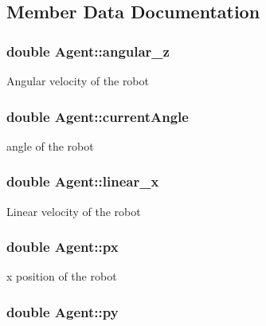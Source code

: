\subsection{Member Data Documentation}
\hypertarget{classAgent_affc842049c5010a5f8bd99a62d650a25}{
\subsubsection[{angular\-\_\-z}]{\setlength{\rightskip}{0pt plus 5cm}double Agent\-::angular\-\_\-z\hspace{0.3cm}{\ttfamily [protected]}}}\label{classAgent_affc842049c5010a5f8bd99a62d650a25}
Angular velocity of the robot \hypertarget{classAgent_a389e3229e62da28d6c686354329e25aa}{
\subsubsection[{current\-Angle}]{\setlength{\rightskip}{0pt plus 5cm}double Agent\-::current\-Angle\hspace{0.3cm}{\ttfamily [protected]}}}\label{classAgent_a389e3229e62da28d6c686354329e25aa}
angle of the robot \hypertarget{classAgent_a77dfc60513d8c90b2848297e09fffba7}{
\subsubsection[{linear\-\_\-x}]{\setlength{\rightskip}{0pt plus 5cm}double Agent\-::linear\-\_\-x\hspace{0.3cm}{\ttfamily [protected]}}}\label{classAgent_a77dfc60513d8c90b2848297e09fffba7}
Linear velocity of the robot \hypertarget{classAgent_af51536ae3b511b53726b84b9226cc772}{
\subsubsection[{px}]{\setlength{\rightskip}{0pt plus 5cm}double Agent\-::px\hspace{0.3cm}{\ttfamily [protected]}}}\label{classAgent_af51536ae3b511b53726b84b9226cc772}
x position of the robot \hypertarget{classAgent_a048e8b32d02a2fd58f046a444a287015}{
\subsubsection[{py}]{\setlength{\rightskip}{0pt plus 5cm}double Agent\-::py\hspace{0.3cm}{\ttfamily [protected]}}}\label{classAgent_a048e8b32d02a2fd58f046a444a287015}
